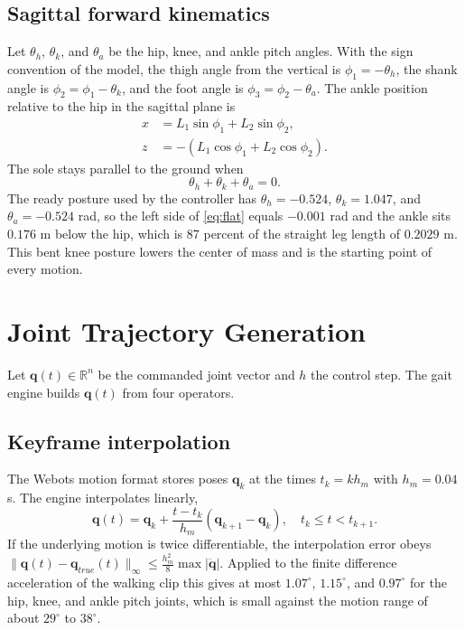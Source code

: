 \documentclass[10pt,journal]{IEEEtran}
\begin{document}
\subsection{Sagittal forward kinematics}
Let $\theta_h$, $\theta_k$, and $\theta_a$ be the hip, knee, and ankle pitch angles. With the sign convention of the model, the thigh angle from the vertical is $\phi_1=-\theta_h$, the shank angle is $\phi_2=\phi_1-\theta_k$, and the foot angle is $\phi_3=\phi_2-\theta_a$. The ankle position relative to the hip in the sagittal plane is
\begin{equation}
\begin{aligned}
x &= L_1\sin\phi_1 + L_2\sin\phi_2,\\
z &= -\left(L_1\cos\phi_1 + L_2\cos\phi_2\right).
\end{aligned}
\label{eq:fk}
\end{equation}
The sole stays parallel to the ground when
\begin{equation}
\theta_h+\theta_k+\theta_a = 0 .
\label{eq:flat}
\end{equation}
The ready posture used by the controller has $\theta_h=-0.524$, $\theta_k=1.047$, and $\theta_a=-0.524$ rad, so the left side of \eqref{eq:flat} equals $-0.001$ rad and the ankle sits $0.176$ m below the hip, which is 87 percent of the straight leg length of $0.2029$ m. This bent knee posture lowers the center of mass and is the starting point of every motion.

\section{Joint Trajectory Generation}
Let $\mathbf{q}(t)\in\mathbb{R}^{n}$ be the commanded joint vector and $h$ the control step. The gait engine builds $\mathbf{q}(t)$ from four operators.

\subsection{Keyframe interpolation}
The Webots motion format stores poses $\mathbf{q}_k$ at the times $t_k=kh_m$ with $h_m=0.04$ s. The engine interpolates linearly,
\begin{equation}
\mathbf{q}(t)=\mathbf{q}_k+\frac{t-t_k}{h_m}\left(\mathbf{q}_{k+1}-\mathbf{q}_k\right),\quad t_k\le t<t_{k+1}.
\label{eq:lin}
\end{equation}
If the underlying motion is twice differentiable, the interpolation error obeys $\lVert\mathbf{q}(t)-\mathbf{q}_{true}(t)\rVert_\infty\le \tfrac{h_m^2}{8}\max\lvert\ddot{\mathbf{q}}\rvert$. Applied to the finite difference acceleration of the walking clip this gives at most $1.07^\circ$, $1.15^\circ$, and $0.97^\circ$ for the hip, knee, and ankle pitch joints, which is small against the motion range of about $29^\circ$ to $38^\circ$.
\end{document}
